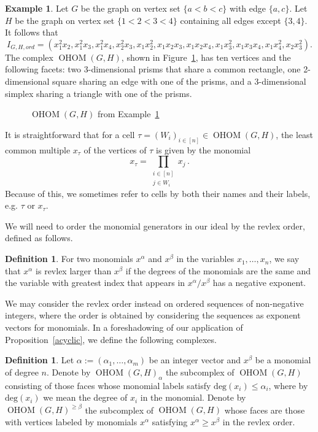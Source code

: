 \documentclass[11pt]{amsart}
\theoremstyle{definition}
\newtheorem{definition}[theorem]{Definition}
\newtheorem{example}[theorem]{Example}
\numberwithin{equation}{section}
\theoremstyle{remark}
\numberwithin{equation}{section}
\begin{document}
\begin{example}\label{bigexample}Let $G$ be the graph on vertex set $\{a<b<c\}$ with edge $\{a,c\}$.  Let $H$ be the graph on vertex set $\{1<2<3<4\}$ containing all edges except $\{3,4\}$. 
It follows that
\[I_{G,H,ord}=\left( x_1^2x_2,x_1^2x_3,x_1^2x_4,x_2^2x_3,x_1x_2^2,x_1x_2x_3,x_1x_2x_4,x_1x_3^2,x_1x_3x_4,x_1x_4^2,x_2x_3^2 \right) .\]
The complex $\operatorname{OHOM}(G,H)$, shown in Figure~\ref{ex1hom}, has ten vertices and the following facets: two 3-dimensional prisms that share a common rectangle, one 2-dimensional square sharing an edge with one of the prisms, and a 3-dimensional simplex sharing a triangle with one of the prisms.
\end{example}

\begin{figure}[ht]
\begin{center}

\end{center}
\caption{$\operatorname{OHOM}(G,H)$ from Example~\ref{bigexample}}
\label{ex1hom}
\end{figure}

It is straightforward that for a cell $\tau=(W_i)_{i\in [n]}\in \operatorname{OHOM}(G,H)$, the least common multiple $x_\tau$ of the vertices of $\tau$ is given by the monomial 
\[ x_\tau = \prod_{\substack{i\in [n] \\ j\in W_i}}x_{j} \, .\]
Because of this, we sometimes refer to cells by both their names and their labels, e.g. $\tau$ or $x_\tau$.

We will need to order the monomial generators in our ideal by the revlex order, defined as follows.

\begin{definition}
For two monomials $x^\alpha$ and $x^\beta$ in the variables $x_1,\ldots,x_n$, we say that $x^\alpha$ is revlex larger than $x^\beta$ if the degrees of the monomials are the same and the variable with greatest index that appears in $x^\alpha / x^\beta$ has a negative exponent.
\end{definition}

We may consider the revlex order instead on ordered sequences of non-negative integers, where the order is obtained by considering the sequences as exponent vectors for monomials.
In a foreshadowing of our application of Proposition~\ref{acyclic}, we define the following complexes.

\begin{definition}
Let $\alpha:=(\alpha_1,\ldots,\alpha_m)$ be an integer vector and $x^\beta$ be a monomial of degree $n$. 
Denote by $\operatorname{OHOM}(G,H)_\alpha$ the subcomplex of $\operatorname{OHOM}(G,H)$ consisting of those faces whose monomial labels satisfy $\mathrm{deg}(x_i)\leq \alpha_i$, where by $\mathrm{deg}(x_i)$ we mean the degree of $x_i$ in the monomial.  
Denote by $\operatorname{OHOM}(G,H)^{\geq \beta}$ the subcomplex of $\operatorname{OHOM}(G,H)$ whose faces are those with vertices labeled by monomials $x^\alpha$ satisfying $x^\alpha\geq x^\beta$ in the revlex order.
\end{definition}
\end{document}
